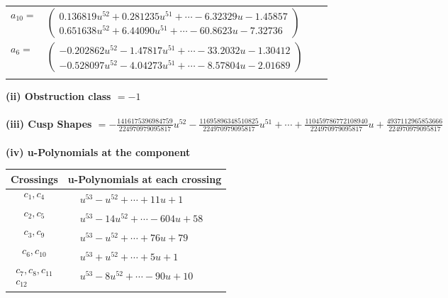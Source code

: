 \documentclass[1p]{elsarticle_modified}
\theoremstyle{definition}
\begin{document}
\begin{tabular}{m{7pt} m{180pt} m{7pt} m{180pt} }
\flushright $a_{10}=$&$\begin{pmatrix}0.136819 u^{52}+0.281235 u^{51}+\cdots-6.32329 u-1.45857\\0.651638 u^{52}+6.44090 u^{51}+\cdots-60.8623 u-7.32736\end{pmatrix}$ \\
\flushright $a_{6}=$&$\begin{pmatrix}-0.202862 u^{52}-1.47817 u^{51}+\cdots-33.2032 u-1.30412\\-0.528097 u^{52}-4.04273 u^{51}+\cdots-8.57804 u-2.01689\end{pmatrix}$\\&\end{tabular}
\flushleft \textbf{(ii) Obstruction class $= -1$}\\~\\
\flushleft \textbf{(iii) Cusp Shapes $= -\frac{1416175396984759}{224970979095817} u^{52}-\frac{11695896348510825}{224970979095817} u^{51}+\cdots+\frac{110459786772108940}{224970979095817} u+\frac{4937112965853666}{224970979095817}$}\\~\\
\newpage\renewcommand{\arraystretch}{1}
\flushleft \textbf{(iv) u-Polynomials at the component}\newline \\
\begin{tabular}{m{50pt}|m{274pt}}
Crossings & \hspace{64pt}u-Polynomials at each crossing \\
\hline $$\begin{aligned}c_{1},c_{4}\end{aligned}$$&$\begin{aligned}
&u^{53}- u^{52}+\cdots+11 u+1
\end{aligned}$\\
\hline $$\begin{aligned}c_{2},c_{5}\end{aligned}$$&$\begin{aligned}
&u^{53}-14 u^{52}+\cdots-604 u+58
\end{aligned}$\\
\hline $$\begin{aligned}c_{3},c_{9}\end{aligned}$$&$\begin{aligned}
&u^{53}- u^{52}+\cdots+76 u+79
\end{aligned}$\\
\hline $$\begin{aligned}c_{6},c_{10}\end{aligned}$$&$\begin{aligned}
&u^{53}+u^{52}+\cdots+5 u+1
\end{aligned}$\\
\hline $$\begin{aligned}c_{7},c_{8},c_{11}\\c_{12}\end{aligned}$$&$\begin{aligned}
&u^{53}-8 u^{52}+\cdots-90 u+10
\end{aligned}$\\
\hline
\end{tabular}\\~\\
\end{document}
